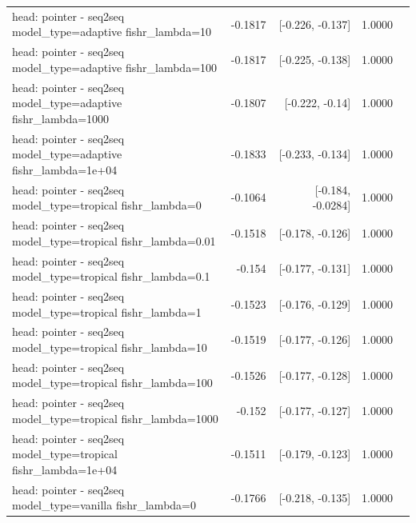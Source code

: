 \documentclass[10pt]{article}
\makeatletter
\newcommand{\stackcell}[1]{\begin{tabular}[t]{@{}l@{}}#1\end{tabular}}
\makeatother
\begin{document}
{\begin{longtable}{lrrrl}
\stackcell{head: pointer - seq2seq\\\footnotesize model\_type=adaptive fishr\_lambda=10 } & -0.1817 & [-0.226, -0.137] & 1.0000 & \\
\stackcell{head: pointer - seq2seq\\\footnotesize model\_type=adaptive fishr\_lambda=100 } & -0.1817 & [-0.225, -0.138] & 1.0000 & \\
\stackcell{head: pointer - seq2seq\\\footnotesize model\_type=adaptive fishr\_lambda=1000 } & -0.1807 & [-0.222, -0.14] & 1.0000 & \\
\stackcell{head: pointer - seq2seq\\\footnotesize model\_type=adaptive fishr\_lambda=1e+04 } & -0.1833 & [-0.233, -0.134] & 1.0000 & \\
\stackcell{head: pointer - seq2seq\\\footnotesize model\_type=tropical fishr\_lambda=0 } & -0.1064 & [-0.184, -0.0284] & 1.0000 & \\
\stackcell{head: pointer - seq2seq\\\footnotesize model\_type=tropical fishr\_lambda=0.01 } & -0.1518 & [-0.178, -0.126] & 1.0000 & \\
\stackcell{head: pointer - seq2seq\\\footnotesize model\_type=tropical fishr\_lambda=0.1 } & -0.154 & [-0.177, -0.131] & 1.0000 & \\
\stackcell{head: pointer - seq2seq\\\footnotesize model\_type=tropical fishr\_lambda=1 } & -0.1523 & [-0.176, -0.129] & 1.0000 & \\
\stackcell{head: pointer - seq2seq\\\footnotesize model\_type=tropical fishr\_lambda=10 } & -0.1519 & [-0.177, -0.126] & 1.0000 & \\
\stackcell{head: pointer - seq2seq\\\footnotesize model\_type=tropical fishr\_lambda=100 } & -0.1526 & [-0.177, -0.128] & 1.0000 & \\
\stackcell{head: pointer - seq2seq\\\footnotesize model\_type=tropical fishr\_lambda=1000 } & -0.152 & [-0.177, -0.127] & 1.0000 & \\
\stackcell{head: pointer - seq2seq\\\footnotesize model\_type=tropical fishr\_lambda=1e+04 } & -0.1511 & [-0.179, -0.123] & 1.0000 & \\
\stackcell{head: pointer - seq2seq\\\footnotesize model\_type=vanilla fishr\_lambda=0 } & -0.1766 & [-0.218, -0.135] & 1.0000 & \\

\end{longtable}}
\end{document}
